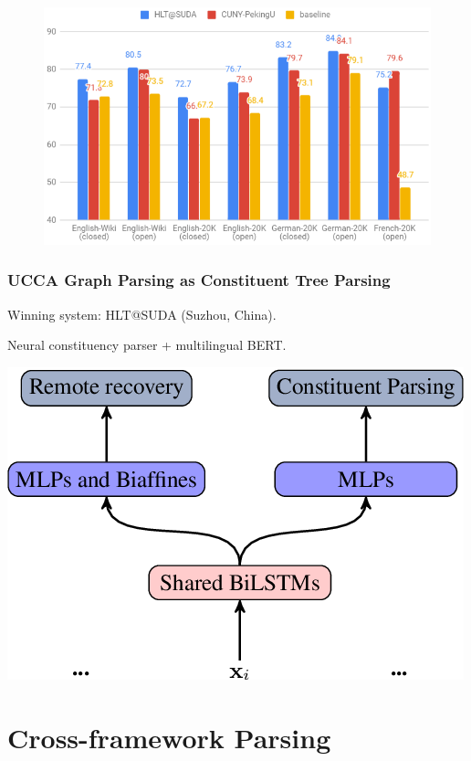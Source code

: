 \documentclass[t,xcolor={svgnames,table}]{beamer}
\begin{document}
\begin{frame}
    \begin{figure}
        \centering
        \includegraphics[width=\textwidth]{Capture}
    \end{figure}
\end{frame}



\begin{frame}
\frametitle{UCCA Graph Parsing as Constituent Tree Parsing}
Winning system: HLT@SUDA (Suzhou, China).

Neural constituency parser + multilingual BERT.
\begin{center}
\includegraphics[width=.6\textwidth]{hltsuda3}
\end{center}
\end{frame}



\section{Cross-framework Parsing}
\end{document}
